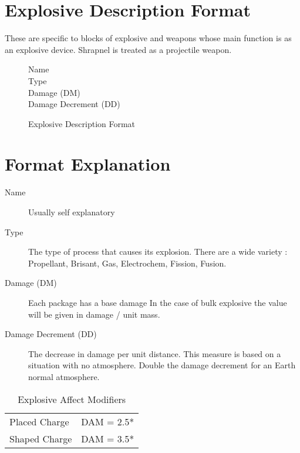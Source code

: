 \clearpage
\section{Explosive Description Format}

These are specific to blocks of explosive and weapons whose main 
function is as an explosive device. Shrapnel is treated as a
projectile weapon.

\begin{figure}[hb]
\centering
\caption{Explosive Description Format}
	\begin{description}
		\item[Name]
		\item[Type ]
		\item[Damage (DM)]
		\item[Damage Decrement (DD)]
	\end{description}
\end{figure}

\section{Format Explanation}

\begin{description}
	\item[Name]
	Usually self explanatory
	\item[Type ]
	The type of process that causes its explosion. There are a wide 
	variety : Propellant, Brisant, Gas, Electrochem, Fission, Fusion.
	\item[Damage (DM)]
	Each package has a base damage In the case of bulk explosive the value
	will be given in damage / unit mass. 
	\item[Damage Decrement (DD)]
	The decrease in damage per unit distance. This measure is based on 
	a situation with no atmosphere. Double the damage decrement for an 
	Earth normal atmosphere. 
\end{description}

\begin{table}[hb]
\centering
\caption{Explosive Affect Modifiers}
	\begin{tabular}{||l|l||} \hline
		Placed Charge  & DAM = 2.5* \\
		Shaped Charge  & DAM = 3.5* \\ \hline
	\end{tabular}
\end{table}



